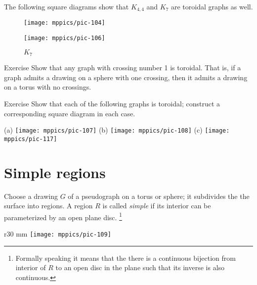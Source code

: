 The following square diagrams show that $K_{4,4}$ and $K_7$ are toroidal graphs as well.

\begin{figure}[h!]
\begin{minipage}{.48\textwidth}
\centering
\texttt{[image: mppics/pic-104]}
\end{minipage}\hfill
\begin{minipage}{.48\textwidth}
\centering
\texttt{[image: mppics/pic-106]}\label{K5-toroidal}
\end{minipage}

\medskip

\begin{minipage}{.45\textwidth}
\centering
\caption*{$K_{4,4}$}
\end{minipage}\hfill
\begin{minipage}{.45\textwidth}
\centering
\caption*{$K_7$}
\end{minipage}
\vskip-4mm
\end{figure}




\begin{thm}{Exercise}
Show that any graph with crossing number 1 is toroidal.
That is, if a graph admits a drawing on a sphere with one crossing, then it admits a drawing on a torus with no crossings.
\end{thm}


\begin{thm}{Exercise}
Show that each of the following graphs is toroidal; construct a corresponding square diagram in each case.

(a) \texttt{[image: mppics/pic-107]}
(b) \texttt{[image: mppics/pic-108]}
(c) \texttt{[image: mppics/pic-117]}
\end{thm}


\section*{Simple regions}

Choose a drawing $G$ of a pseudograph on a torus or sphere;
it subdivides the the surface into regions.
A region $R$ is called \emph{simple} if its interior can be parameterized by an open plane disc.%
\footnote{Formally speaking it means that the there is a continuous bijection from interior of $R$ to an open disc in the plane such that its inverse is also continuous.}

\begin{wrapfigure}{r}{30 mm}
\vskip-4mm
\centering
\texttt{[image: mppics/pic-109]}
\end{wrapfigure}

